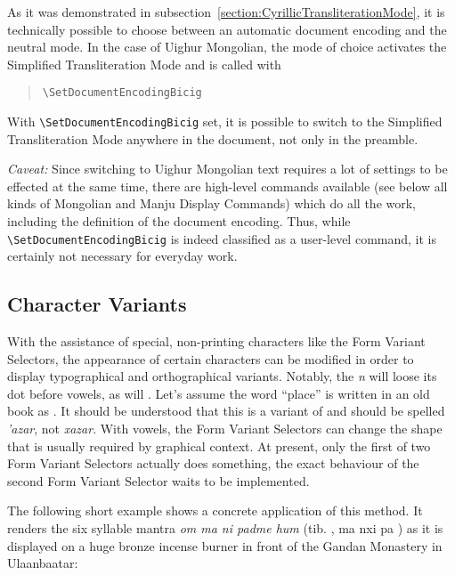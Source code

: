 \documentclass[11pt,a4paper]{article}
\begin{document}
As it was demonstrated in subsection~\ref{section:CyrillicTransliterationMode},
it is technically possible to choose between an automatic document encoding
and the neutral mode. In the case of Uighur Mongolian, the mode of choice
activates the Simplified Transliteration Mode and is called with 
\begin{quote}
\begin{verbatim}
\SetDocumentEncodingBicig
\end{verbatim}
\end{quote}


With
\verb"\SetDocumentEncodingBicig"\label{cmd:SetDocumentEncodingBicig} set,
it is possible to switch to the Simplified Transliteration Mode anywhere
in the document, not only in the preamble.

\textit{Caveat:} Since switching to Uighur Mongolian text
requires a lot of settings to be effected at the same time, there
are high-level commands available (see below all kinds of  Mongolian
and Manju Display Commands) which do all the work, including the definition of the
document encoding. Thus, while \verb|\SetDocumentEncodingBicig|
is indeed classified as a user-level command, it is certainly not
necessary for everyday work.


\subsection{Character Variants}

With the assistance of special, non-printing characters like the
Form Variant Selectors, the appearance of certain characters can be
modified in order to display typographical and orthographical
variants. Notably, the \emph{n} will loose its dot before vowels,
as will \emph{\g}. Let's assume the word ``place'' is written in an
old book as . It should be understood that this is a
variant of  and should be spelled \emph{\g'azar}, not
\emph{xazar}. With vowels, the Form Variant Selectors can change the
shape that is usually required by graphical context. At present,
only the first of two Form Variant Selectors actually does
something, the exact behaviour of the second Form Variant Selector
waits to be implemented.

The following short example shows a concrete application of this
method. It renders the six syllable mantra \emph{om ma ni padme hum}
(tib.  {\tib \om, ma nxi pa \hung}) as it is
displayed on a huge bronze incense burner in front of the Gandan
Monastery in Ulaanbaatar:
\end{document}
